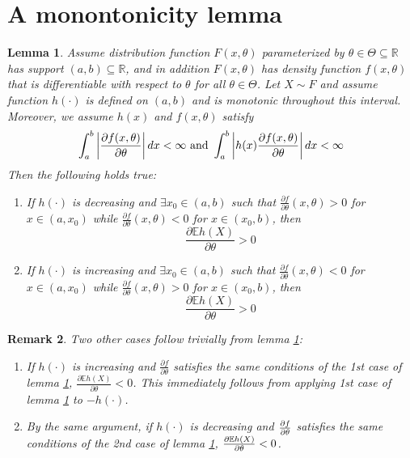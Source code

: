 \documentclass[11pt,a4]{amsart}
\newcommand{\pd}{\partial}
\newtheorem{lemma}{Lemma}[section]
\newtheorem{remark}[lemma]{Remark}
\newcommand{\E }{{\mathbb E}}
\newcommand{\1}{{\mathbf 1}}
\begin{document}
\section{A monontonicity lemma}
\setcounter{equation}{0}
\begin{lemma} \label{lemma:I}
  Assume distribution function $F(x, \theta)$ parameterized by 
  $\theta \in \Theta \subseteq \mathbb R$ has support
  $(a, b) \subseteq \mathbb R$,
  and in addition $F(x, \theta)$ has density
  function $f(x, \theta)$ that is differentiable with respect to
  $\theta$ for all $\theta \in \Theta$.
  Let $X \sim F$ and assume function $h(\cdot)$ is defined on $(a, b)$
  and is monotonic throughout this interval.
  Moreover, we assume $h(x)$ and $f(x, \theta)$ satisfy
  \begin{equation}\label{eq:frt}
    \int_a^b \left| {\pd f(x, \theta) \over \pd \theta} \right| dx
    < \infty \text { and }
    \int_a^b \left| h(x) {\pd f(x, \theta) \over \pd \theta} \right| dx
    < \infty
  \end{equation}
  Then the following holds true:
  \begin{enumerate}
  \item If $h(\cdot)$ is decreasing and $\exists x_0 \in (a, b)$ such that
    $\frac{\pd f}{\pd \theta}(x, \theta) > 0$ for $x \in (a, x_0)$ while
    $\frac{\pd f}{\pd \theta}(x, \theta) < 0$ for $x \in (x_0, b)$, then
    \[
    \frac{\pd \E h(X)}{\pd \theta} > 0
    \]
  \item If $h(\cdot)$ is increasing and $\exists x_0 \in (a, b)$ such that 
    $\frac{\pd f}{\pd \theta}(x, \theta) < 0$ for $x \in (a, x_0)$  while
    $\frac{\pd f}{\pd \theta}(x, \theta) > 0$ for $x \in (x_0, b)$, then
    \[
    \frac{\pd \E h(X)}{\pd \theta} > 0
    \]
  \end{enumerate}
\end{lemma}
\begin{remark}
  \label{remark:I}
  Two other cases follow trivially from lemma \ref{lemma:I}:
  \begin{enumerate}
  \item If $h(\cdot)$ is increasing and $\frac{\pd f}{\pd \theta}$
    satisfies the
    same conditions of the 1st case of lemma \ref{lemma:I},
    $\frac{\pd \E h(X)}{\pd \theta} < 0$. This immediately follows
    from applying 1st case of lemma \ref{lemma:I} to $-h(\cdot)$.
  \item By the same argument, if $h(\cdot)$ is decreasing and
    ${\pd f \over \pd \theta}$ satisfies the same conditions of the
    2nd case of lemma \ref{lemma:I}, ${\pd \E h(X) \over \pd \theta} < 0$.
  \end{enumerate}
\end{remark}
\end{document}
